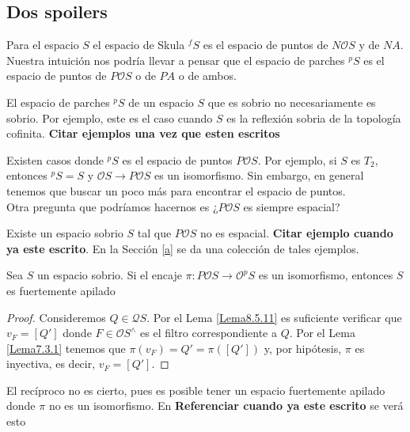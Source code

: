 \subsection{Dos spoilers}

Para el espacio $S$ el espacio de Skula $^fS$ es el espacio de puntos de $N\mathcal{O}S$ y de $NA$. Nuestra intuición nos podría llevar a pensar que el espacio de parches $^pS$ es el espacio de puntos de $P\mathcal{O}S$ o de $PA$ o de ambos.\\

\begin{ej}\label{Ejemplo9.2.1}
    El espacio de parches $^pS$ de un espacio $S$ que es sobrio no necesariamente es sobrio. Por ejemplo, este es el caso cuando $S$ es la reflexión  sobria de la topología cofinita. \textbf{Citar ejemplos una vez que esten escritos}
\end{ej}

Existen casos donde $^pS$ es el espacio de puntos $P\mathcal{O}S$. Por ejemplo, si $S$ es $T_2$, entonces $^pS=S$ y $\mathcal{O}S\to P\mathcal{O}S$ es un isomorfismo. Sin embargo, en general tenemos que buscar un poco más para encontrar el espacio de puntos.\\

Otra pregunta que podríamos hacernos es ¿$P\mathcal{O}S$ es siempre espacial?

\begin{ej}\label{Ejemplo9.2.2}
    Existe un espacio sobrio $S$ tal que $P\mathcal{O}S$ no es espacial. \textbf{Citar ejemplo cuando ya este escrito}. En la Sección \ref{a} se da una colección de tales ejemplos.
\end{ej}

\begin{lem}\label{Lema9.2.3}
    Sea $S$ un espacio sobrio. Si el encaje $\pi\colon P\mathcal{O}S\to \mathcal{O}^pS$ es un isomorfismo, entonces $S$ es fuertemente apilado
\end{lem}

\begin{proof}
    Consideremos $Q\in \mathcal{Q}S$. Por el Lema \ref{Lema8.5.11} es suficiente verificar que $v_F=[Q']$ donde $F\in \mathcal{O}S^\wedge$ es el filtro correspondiente a $Q$. Por el Lema \ref{Lema7.3.1} tenemos que $\pi(v_F)=Q'=\pi([Q'])$ y, por hipótesis, $\pi$ es inyectiva, es decir, $v_F=[Q']$.
\end{proof}

El recíproco no es cierto, pues es posible tener un espacio fuertemente apilado donde $\pi$ no es un isomorfismo. En \textbf{Referenciar cuando ya este escrito} se verá esto


